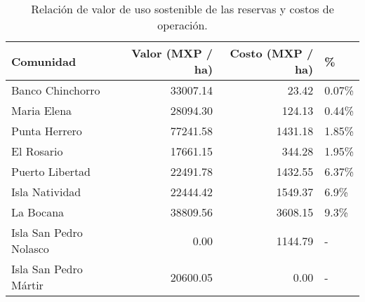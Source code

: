 \begin{table}[!h]

\caption{\label{tab:sust_val_cost}Relación de valor de uso sostenible de las reservas y costos de operación.}
\centering
\begin{tabular}[t]{lrrl}
\toprule
Comunidad & Valor (MXP / ha) & Costo (MXP / ha) & \%\\
\midrule
Banco Chinchorro & 33007.14 & 23.42 & 0.07\%\\
Maria Elena & 28094.30 & 124.13 & 0.44\%\\
Punta Herrero & 77241.58 & 1431.18 & 1.85\%\\
El Rosario & 17661.15 & 344.28 & 1.95\%\\
Puerto Libertad & 22491.78 & 1432.55 & 6.37\%\\
\addlinespace
Isla Natividad & 22444.42 & 1549.37 & 6.9\%\\
La Bocana & 38809.56 & 3608.15 & 9.3\%\\
Isla San Pedro Nolasco & 0.00 & 1144.79 & -\\
Isla San Pedro Mártir & 20600.05 & 0.00 & -\\
\bottomrule
\end{tabular}
\end{table}